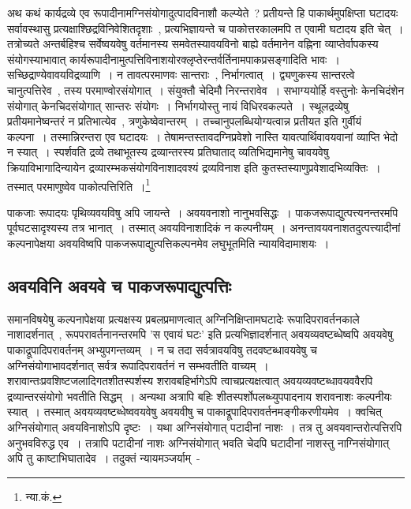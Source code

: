 		{\fontsize{11.7}{0}\selectfont\s अथ कथं कार्यद्रव्ये एव रूपादीनामग्निसंयोगादुत्पादविनाशौ कल्प्येते~? प्रतीयन्ते हि पाकार्थमुपक्षिप्ता घटादयः सर्वावस्थासु प्रत्यक्षाश्छिद्रविनिवेशितदृशाः~, प्रत्यभिज्ञायन्ते च पाकोत्तरकालमपि त एवामी घटादय इति चेत्~। तत्रोच्यते अन्तर्बहिश्च सर्वेष्वयवेषु वर्तमानस्य समवेतस्यावयविनो बाह्ये वर्तमानेन  वह्निना व्याप्तेर्वापकस्य संयोगस्याभावात् कार्यरूपादीनामुत्पत्तिविनाशयोरक्लृप्तेरन्तर्वर्तिनामपाकप्रसङ्गादिति भावः~। सच्छिद्राण्येवावयविद्रव्याणि~। न तावत्परमाणवः सान्तराः~, निर्भागत्वात्~। द्व्यणुकस्य सान्तरत्वे चानुत्पत्तिरेव~, तस्य परमाण्वोरसंयोगात्~। संयुक्तौ चेदिमौ निरन्तरावेव~। सभाग्ययोर्हि वस्तुनोः केनचिदंशेन संयोगात् केनचिदसंयोगात् सान्तरः संयोगः~। निर्भागयोस्तु नायं विधिरवकल्पते~। स्थूलद्रव्येषु प्रतीयमानेष्वन्तरं न प्रतिभात्येव~, त्रणुकेष्वेवान्तरम्~। तच्चानुपलब्धियोग्यत्वान्न प्रतीयत इति गुर्वीयं कल्पना~। तस्मान्निरन्तरा एव घटादयः~। तेषामन्तस्तावदग्निप्रवेशो नास्ति यावत्पार्थिवावयवानां व्याप्ति भेदो न स्यात्~। स्पर्शवति द्रव्ये तथाभूतस्य द्रव्यान्तरस्य प्रतिघाताद् व्यतिभिद्यमानेषु चावयवेषु क्रियाविभागादिन्यायेन द्रव्यारम्भकसंयोगविनाशादवश्यं द्रव्यविनाश इति कुतस्तस्याणुप्रवेशादभिव्यक्तिः~। तस्मात् परमाणुष्वेव पाकोत्पत्तिरिति~।\footnote{न्या.कं.}}

	पाकजाः रूपादयः पृथिव्यवयविषु अपि जायन्ते~। अवयवनाशो नानुभवसिद्धः~। पाकजरूपाद्युत्पत्त्यनन्तरमपि पूर्वघटसादृश्यस्य तत्र भानात्~। तस्मात् अवयविनाशादिकं न कल्पनीयम्~। अनन्तावयवनाशतदुत्पत्त्यादीनां कल्पनापेक्षया अवयविष्वपि पाकजरूपाद्युत्पत्तिकल्पनमेव लघुभूतमिति न्यायविदामाशयः~।

		\subsection{अवयविनि अवयवे च पाकजरूपाद्युत्पत्तिः}

		समानविषयेषु कल्पनापेक्षया प्रत्यक्षस्य प्रबलप्रमाणत्वात् अग्निनिक्षिप्तामघटादेः रूपादिपरावर्तनकाले नाशादर्शनात्~, रूपपरावर्तनानन्तरमपि 'स एवायं घटः' इति प्रत्यभिज्ञादर्शनात् अवयव्यवष्टब्धेष्वपि अवयवेषु पाकाद्रूपादिपरावर्तनम् अभ्युपगन्तव्यम्~। न च तदा सर्वत्रावयविषु तदवष्टब्धावयवेषु च अग्निसंयोगाभावदर्शनात् सर्वत्र रूपादिपरावर्तनं न सम्भवतीति वाच्यम्~। शरावान्तःप्रवशिष्टजलादिगतशीतस्पर्शस्य शरावबहिर्भागेऽपि त्वाचप्रत्यक्षत्वात् अवयव्यवष्टब्धावयववैरपि द्रव्यान्तरसंयोगो भवतीति सिद्धम्~। अन्यथा अत्रापि बहिः शीतस्पर्शोपलब्ध्युपपादनाय शरावनाशः कल्पनीयः स्यात्~। तस्मात् अवयव्यवष्टब्धेष्ववयवेषु अवयवीषु च पाकाद्रूपादिपरावर्तनमङ्गीकरणीयमेव~। क्वचित् अग्निसंयोगात् अवयविनाशोऽपि दृष्टः~। यथा अग्निसंयोगात् पटादीनां नाशः~।  तत्र तु अवयवान्तरोत्पत्तिरपि अनुभवविरुद्ध एव~। तत्रापि पटादीनां नाशः‌ अग्निसंयोगात् भवति चेदपि घटादीनां नाशस्तु नाग्निसंयोगात् अपि तु काष्टाभिघातादेव~। तदुक्तं न्यायमञ्जर्याम्~-

